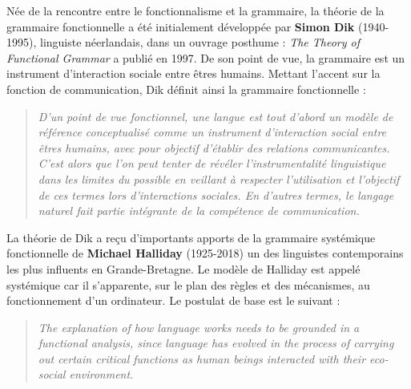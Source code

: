 Née de la rencontre entre le fonctionnalisme et la grammaire, la théorie de la grammaire fonctionnelle a été initialement développée par \textbf{Simon Dik} (1940-1995), linguiste néerlandais, dans un ouvrage posthume : \textit{The Theory of Functional Grammar} a publié en 1997. De son point de vue, la grammaire est un instrument d’interaction sociale entre êtres humains. Mettant l’accent sur la fonction de communication, Dik définit ainsi la grammaire fonctionnelle :
\begin{quote}\small\itshape
D’un point de vue fonctionnel, une langue est tout d’abord un modèle de référence conceptualisé comme un instrument d’interaction social entre êtres humains, avec pour objectif d’établir des relations communicantes. C’est alors que l’on peut tenter de révéler l’instrumentalité linguistique dans les limites du possible en veillant à respecter l’utilisation et l’objectif de ces termes lors d’interactions sociales. En d’autres termes, le langage naturel fait partie intégrante de la compétence de communication.
\end{quote}

La théorie de Dik a reçu d’importants apports de la grammaire systémique fonctionnelle de \textbf{Michael Halliday} (1925-2018) un des linguistes contemporains les plus influents en Grande-Bretagne. Le modèle de Halliday est appelé systémique car il s’apparente, sur le plan des règles et des mécanismes, au fonctionnement d’un ordinateur. Le postulat de base est le suivant :
\begin{quote}\small\itshape
The explanation of how language works needs to be grounded in a functional analysis, since language has evolved in the process of carrying out certain critical functions as human beings interacted with their eco-social environment.
\end{quote}

